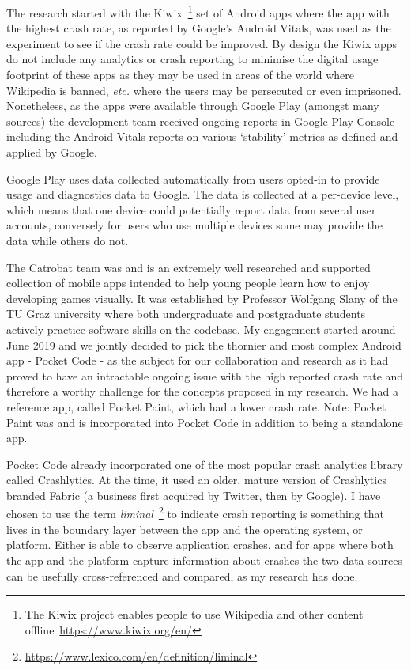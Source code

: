 The research started with the Kiwix~\footnote{The Kiwix project enables people to use Wikipedia and other content offline~\url{https://www.kiwix.org/en/}} set of Android apps where the app with the highest crash rate, as reported by Google's Android Vitals, was used as the experiment to see if the crash rate could be improved. By design the Kiwix apps do not include any analytics or crash reporting to minimise the digital usage footprint of these apps as they may be used in areas of the world where Wikipedia is banned, \emph{etc.} where the users may be persecuted or even imprisoned. Nonetheless, as the apps were available through Google Play (amongst many sources) the development team received ongoing reports in Google Play Console including the Android Vitals reports on various `stability' metrics as defined and applied by Google. 

Google Play uses data collected automatically from users opted-in to provide usage and diagnostics data to Google. The data is collected at a per-device level, which means that one device could potentially report data from several user accounts, conversely for users who use multiple devices some may provide the data while others do not.

The Catrobat team was and is an extremely well researched and supported collection of mobile apps intended to help young people learn how to enjoy developing games visually. It was established by Professor Wolfgang Slany of the TU Graz university where both undergraduate and postgraduate students actively practice software skills on the codebase. My engagement started around June 2019 and we jointly decided to pick the thornier and most complex Android app - Pocket Code - as the subject for our collaboration and research as it had proved to have an intractable ongoing issue with the high reported crash rate and therefore a worthy challenge for the concepts proposed in my research. We had a reference app, called Pocket Paint, which had a lower crash rate. Note: Pocket Paint was and is incorporated into Pocket Code in addition to being a standalone app.

Pocket Code already incorporated one of the most popular crash analytics library called Crashlytics. At the time, it used an older, mature version of Crashlytics branded Fabric (a business first acquired by Twitter, then by Google). I have chosen to use the term \emph{liminal}~\footnote{\url{https://www.lexico.com/en/definition/liminal}} to indicate crash reporting is something that lives in the boundary layer between the app and the operating system, or platform. Either is able to observe application crashes, and for apps where both the app and the platform capture information about crashes the two data sources can be usefully cross-referenced and compared, as my research has done.

